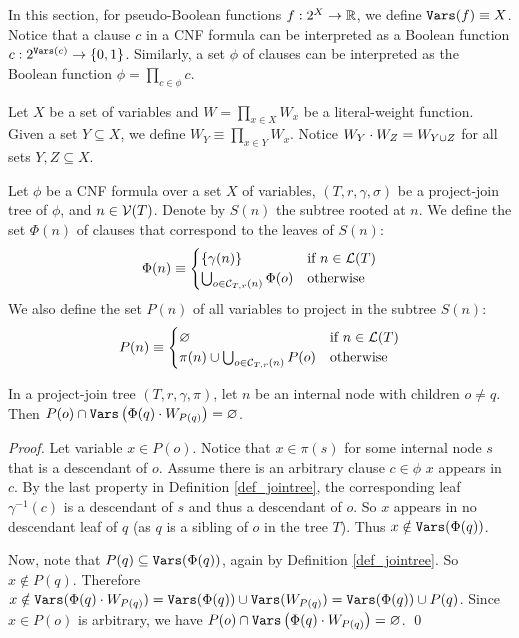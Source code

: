 In this section, for pseudo-Boolean functions $f : 2^X \to \mathbb{R}$, we define $\texttt{\upshape Vars}(f) \equiv X$.
Notice that a clause $c$ in a CNF formula can be interpreted as a Boolean function $c : 2^{\texttt{\upshape Vars}(c)} \to \left\{ 0, 1 \right\}$.
Similarly, a set $\phi$ of clauses can be interpreted as the Boolean function $\phi = \prod_{c \in \phi} c$.

Let $X$ be a set of variables and $W = \prod_{x \in X} W_x$ be a literal-weight function.
Given a set $Y \subseteq X$, we define $W_{Y} \equiv \prod_{x \in Y} W_x$.
Notice $W_Y \cdot W_Z = W_{Y \cup Z}$ for all sets $Y, Z \subseteq X$.

Let $\phi$ be a CNF formula over a set $X$ of variables, $(T, r, \gamma, \sigma)$ be a project-join tree of $\phi$, and $n \in \mathcal{V}(T)$.
Denote by $S(n)$ the subtree rooted at $n$.
We define the set $\Phi(n)$ of clauses that correspond to the leaves of $S(n)$:
\begin{align*}
    \Phi(n) \equiv
    \begin{cases}
        \left\{ \gamma(n) \right\} & \text{if } n \in \mathcal{L}(T) \\
        \bigcup_{o \in \mathcal{C}_{T,r}(n)} \Phi(o) & \text{otherwise}
    \end{cases}
\end{align*}
We also define the set $P(n)$ of all variables to project in the subtree $S(n)$:
\begin{align*}
    P(n) \equiv
    \begin{cases}
       \varnothing & \text{if } n \in \mathcal{L}(T) \\
        \pi(n) \cup \bigcup_{o \in \mathcal{C}_{T,r}(n)} P(o) & \text{otherwise}
    \end{cases}
\end{align*}

\begin{lemma}
\label{lemma_disjoint_P}
    In a project-join tree $(T, r, \gamma, \pi)$, let $n$ be an internal node with children $o \ne q$.
    Then $P(o) \cap \texttt{\upshape Vars} \left( \Phi(q) \cdot W_{P(q)} \right) = \varnothing$.
\end{lemma}
\begin{proof}
    Let variable $x \in P(o)$.
    Notice that $x \in \pi(s)$ for some internal node $s$ that is a descendant of $o$.
    Assume there is an arbitrary clause $c \in \phi$ \st{} $x$ appears in $c$.
    By the last property in Definition \ref{def_jointree}, the corresponding leaf $\gamma^{-1}(c)$ is a descendant of $s$ and thus a descendant of $o$.
    So $x$ appears in no descendant leaf of $q$ (as $q$ is a sibling of $o$ in the tree $T$).
    Thus $x \notin \texttt{\upshape Vars}(\Phi(q))$.

    Now, note that $P(q) \subseteq \texttt{\upshape Vars}(\Phi(q))$, again by Definition \ref{def_jointree}.
    So $x \notin P(q)$.
    Therefore $x \notin \texttt{\upshape Vars}(\Phi(q) \cdot W_{P(q)}) = \texttt{\upshape Vars}(\Phi(q)) \cup \texttt{\upshape Vars}(W_{P(q)}) = \texttt{\upshape Vars}(\Phi(q)) \cup P(q)$.
    Since $x \in P(o)$ is arbitrary, we have $P(o) \cap \texttt{\upshape Vars} \left( \Phi(q) \cdot W_{P(q)} \right) = \varnothing$.
\qed
\end{proof}

